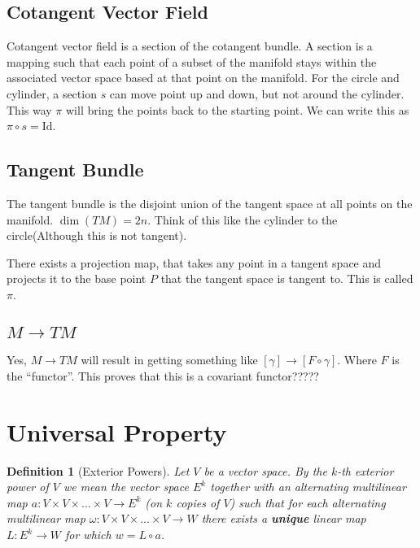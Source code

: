 \documentclass[10pt]{amsart}
\newtheorem{definition}{Definition}[section]
\newcommand{\ra}{\rightarrow}
\newcommand{\id}{\text{Id}}
\renewcommand{\o}{\circ}
\newcommand{\x}{\times}
\renewcommand{\*}{\star}
\begin{document}
\subsection{Cotangent Vector Field}%
\label{sub:cotangent_vector_field}

Cotangent vector field is a section of the cotangent bundle. A section is a
mapping such that each point of a subset of the manifold stays within the
associated vector space based at that point on the manifold. For the circle and
cylinder, a section $s$ can move point up and down, but not around the
cylinder. This way $\pi$ will bring the points back to the starting point. We
can write this as $\pi\o s=\id$.

\subsection{Tangent Bundle}%
\label{sub:tangent_bundle}

The tangent bundle is the disjoint union of the tangent space at all points on
the manifold. $\dim(TM)=2n$. Think of this like the cylinder to the
circle(Although this is not tangent).

There exists a projection map, that takes any point in a tangent space and
projects it to the base point $P$ that the tangent space is tangent to. This is
called $\pi$.

\subsection{$M\ra TM$}%
\label{sub:_mra_tm_}

Yes, $M\ra TM$ will result in getting something like $[\gamma]\ra[F\o\gamma]$.
Where $F$ is the ``functor''. This proves that this is a covariant functor?????

\section{Universal Property}%
\label{sec:universal_property}

\begin{definition}[Exterior Powers]
   Let $V$ be a vector space. By the $k$-th exterior power of $V$ we mean the
   vector space $E^k$ together with an alternating multilinear map
   $a:V\x V\x\ldots\x V\ra E^k$ (on $k$ copies of $V$) such that for each
   alternating multilinear map $\omega:V\x V\x\ldots\x V\ra W$ there exists a
   \textbf{unique} linear map $L:E^k\ra W$ for which $w=L\o a$.
\end{definition}
\end{document}
